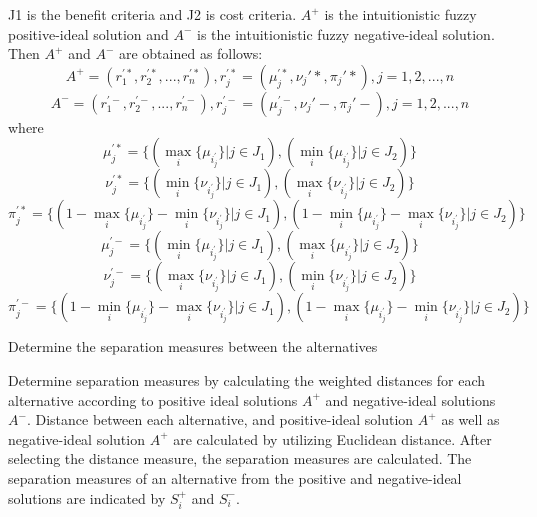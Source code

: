 \begin{flushleft}
\begin{steps}
J1 is the benefit criteria and J2 is cost criteria. $A^+$ is the
intuitionistic fuzzy positive-ideal solution and $A^-$ is the
intuitionistic fuzzy negative-ideal solution. Then $A^+$ and
$A^-$ are obtained as follows:
\begin{equation}
    A^+= (r_1^{'*},r_2^{'*},...,r_n^{'*}), r_j^{'*}=(\mu_j^{'*},\nu_j{'*},\pi_j{'*}), j= 1,2,...,n
\end{equation}
\begin{equation}
    A^-= (r_1^{'-},r_2^{'-},...,r_n^{'-}), r_j^{'-}=(\mu_j^{'-},\nu_j{'-},\pi_j{'-}), j= 1,2,...,n
\end{equation}
where
\begin{equation*}
    \mu_j^{'*}=\{(\max_{i} \{\mu_i_j^{'}\}\vert j\in J_1) , (\min_{i} \{\mu_i_j^{'}\}\vert j\in J_2)\}
\end{equation*}
\begin{equation*}
    \nu_j^{'*}=\{(\min_{i} \{\nu_i_j^{'}\}\vert j\in J_1) , (\max_{i} \{\nu_i_j^{'}\}\vert j\in J_2)\}
\end{equation*}
\begin{equation*}
    \pi_j^{'*}=\{(1-\max_{i} \{\mu_i_j^{'}\}-\min_{i} \{\nu_i_j^{'}\}\vert j\in J_1) , (1-\min_{i} \{\mu_i_j^{'}\}-\max_{i} \{\nu_i_j^{'}\}\vert j\in J_2)\}
\end{equation*}
\begin{equation*}
    \mu_j^{'-}=\{(\min_{i} \{\mu_i_j^{'}\}\vert j\in J_1) , (\max_{i} \{\mu_i_j^{'}\}\vert j\in J_2)\}
\end{equation*}
\begin{equation*}
    \nu_j^{'-}=\{(\max_{i} \{\nu_i_j^{'}\}\vert j\in J_1) , (\min_{i} \{\nu_i_j^{'}\}\vert j\in J_2)\}
\end{equation*}
\begin{equation*}
    \pi_j^{'-}=\{(1-\min_{i} \{\mu_i_j^{'}\}-\max_{i} \{\nu_i_j^{'}\}\vert j\in J_1) , (1-\max_{i} \{\mu_i_j^{'}\}-\min_{i} \{\nu_i_j^{'}\}\vert j\in J_2)\}
\end{equation*}



\item Determine the separation measures between the
alternatives

Determine separation measures by calculating the
weighted distances for each alternative according to positive ideal solutions
$A^+$ and negative-ideal solutions $A^-$. Distance between
each alternative, and positive-ideal solution $A^+$ as well as negative-ideal solution $A^+$  are calculated by utilizing Euclidean distance. After selecting the distance measure, the separation measures are calculated. The separation measures of an alternative from the positive and negative-ideal solutions are indicated by $S_i^+$ and $S_i^-$.


\end{steps}
\end{flushleft}
